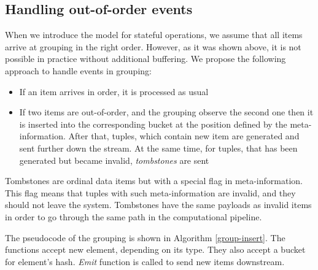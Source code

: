 \subsection{Handling out-of-order events}
When we introduce the model for stateful operations, we assume that all items arrive at grouping in the right order. However, as it was shown above, it is not possible in practice without additional buffering. We propose the following approach to handle events in grouping:

\begin{itemize}
    \item If an item arrives in order, it is processed as usual
    \item If two items are out-of-order, and the grouping observe the second one then it is inserted into the corresponding bucket at the position defined by the meta-information. After that, tuples, which contain new item are generated and sent further down the stream. At the same time, for tuples, that has been generated but became invalid, {\it tombstones} are sent
\end{itemize}

Tombstones are ordinal data items but with a special flag in meta-information. This flag means that tuples with such meta-information are invalid, and they should not leave the system. Tombstones have the same payloads as invalid items in order to go through the same path in the computational pipeline.

The pseudocode of the grouping is shown in Algorithm \ref{group-insert}. The functions accept new element, depending on its type. They also accept a bucket for element's hash. {\it Emit} function is called to send new items downstream.

